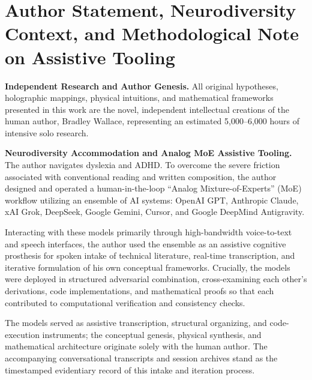 \documentclass[11pt,a4paper]{article}
\theoremstyle{plain}
\theoremstyle{definition}
\theoremstyle{remark}
\begin{document}
\section*{Author Statement, Neurodiversity Context, and Methodological Note on Assistive Tooling}
\noindent\textbf{Independent Research and Author Genesis.} 
All original hypotheses, holographic mappings, physical intuitions, and mathematical frameworks presented in this work are the novel, independent intellectual creations of the human author, Bradley Wallace, representing an estimated 5,000--6,000 hours of intensive solo research.

\vspace{0.5em}
\noindent\textbf{Neurodiversity Accommodation and Analog MoE Assistive Tooling.}
The author navigates dyslexia and ADHD. To overcome the severe friction associated with conventional reading and written composition, the author designed and operated a human-in-the-loop ``Analog Mixture-of-Experts'' (MoE) workflow utilizing an ensemble of AI systems: OpenAI GPT, Anthropic Claude, xAI Grok, DeepSeek, Google Gemini, Cursor, and Google DeepMind Antigravity.

Interacting with these models primarily through high-bandwidth voice-to-text and speech interfaces, the author used the ensemble as an assistive cognitive prosthesis for spoken intake of technical literature, real-time transcription, and iterative formulation of his own conceptual frameworks. Crucially, the models were deployed in structured adversarial combination, cross-examining each other's derivations, code implementations, and mathematical proofs so that each contributed to computational verification and consistency checks.

The models served as assistive transcription, structural organizing, and code-execution instruments; the conceptual genesis, physical synthesis, and mathematical architecture originate solely with the human author. The accompanying conversational transcripts and session archives stand as the timestamped evidentiary record of this intake and iteration process.
\end{document}
